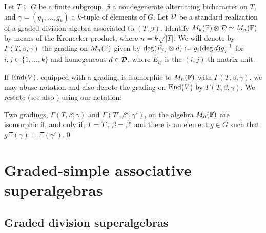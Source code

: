 \begin{defi}\label{def:explicit-grd-assoc}
	Let $T \subseteq G$ be a finite subgroup, $\beta$ a nondegenerate alternating bicharacter on $T$, and $\gamma = (g_1, \ldots, g_k)$ a $k$-tuple of elements of $G$. Let $\mathcal{D}$ be a standard realization of a graded division algebra associated to $(T, \beta)$. Identify $M_k(\mathbb{F})\otimes \mathcal{D} \simeq M_n(\mathbb{F})$ by means of the Kronecker product, where $n=k\sqrt{|T|}$. We will denote by $\Gamma(T, \beta, \gamma)$ the grading on $M_n(\mathbb{F})$ given by $\deg (E_{ij} \otimes d) := g_i (\deg d) g_j^{-1}$ for $i,j\in \{1, \ldots , k\}$ and homogeneous $d\in \mathcal{D}$, where $E_{ij}$ is the $(i,j)$-th matrix unit.
\end{defi}

If $\operatorname{End}(V)$, equipped with a grading, is isomorphic to $M_n(\mathbb{F})$ with $\Gamma(T, \beta, \gamma)$, we may abuse notation and also denote the grading on $\operatorname{End}(V)$ by $\Gamma(T,\beta,\gamma)$.
We restate \cite[Theorem 2.27]{livromicha} (see also \cite[Theorem 2.6]{BK10}) using our notation:

\begin{thm}\label{thm:classification-matrix}%
	Two gradings, $\Gamma(T,\beta,\gamma)$ and $\Gamma(T',\beta',\gamma')$, on the algebra $M_n(\mathbb{F})$ are isomorphic if, and only if, $T=T'$, $\beta=\beta'$ and there is an element $g\in G$ such that $g \Xi(\gamma)=\Xi(\gamma')$.\qed
\end{thm}



\section{Graded-simple associative superalgebras}

\subsection{Graded division superalgebras}\label{ssec:grd-div-salg}


